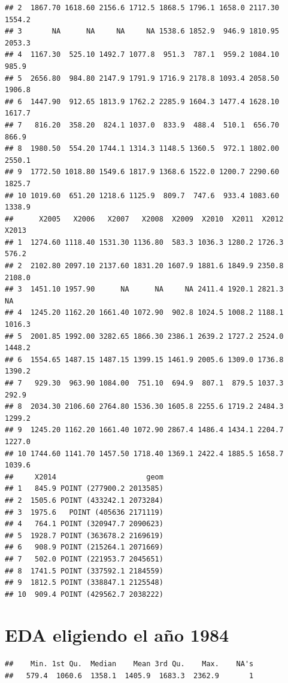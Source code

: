 \documentclass[11pt,]{article}
\newenvironment{Shaded}{\begin{snugshade}}{\end{snugshade}}
\newcommand{\KeywordTok}[1]{\textcolor[rgb]{0.13,0.29,0.53}{\textbf{#1}}}
\newcommand{\OperatorTok}[1]{\textcolor[rgb]{0.81,0.36,0.00}{\textbf{#1}}}
\newcommand{\NormalTok}[1]{#1}
\begin{document}
\begin{verbatim}
## 2  1867.70 1618.60 2156.6 1712.5 1868.5 1796.1 1658.0 2117.30 1554.2
## 3       NA      NA     NA     NA 1538.6 1852.9  946.9 1810.95 2053.3
## 4  1167.30  525.10 1492.7 1077.8  951.3  787.1  959.2 1084.10  985.9
## 5  2656.80  984.80 2147.9 1791.9 1716.9 2178.8 1093.4 2058.50 1906.8
## 6  1447.90  912.65 1813.9 1762.2 2285.9 1604.3 1477.4 1628.10 1617.7
## 7   816.20  358.20  824.1 1037.0  833.9  488.4  510.1  656.70  866.9
## 8  1980.50  554.20 1744.1 1314.3 1148.5 1360.5  972.1 1802.00 2550.1
## 9  1772.50 1018.80 1549.6 1817.9 1368.6 1522.0 1200.7 2290.60 1825.7
## 10 1019.60  651.20 1218.6 1125.9  809.7  747.6  933.4 1083.60 1338.9
##      X2005   X2006   X2007   X2008  X2009  X2010  X2011  X2012  X2013
## 1  1274.60 1118.40 1531.30 1136.80  583.3 1036.3 1280.2 1726.3  576.2
## 2  2102.80 2097.10 2137.60 1831.20 1607.9 1881.6 1849.9 2350.8 2108.0
## 3  1451.10 1957.90      NA      NA     NA 2411.4 1920.1 2821.3     NA
## 4  1245.20 1162.20 1661.40 1072.90  902.8 1024.5 1008.2 1188.1 1016.3
## 5  2001.85 1992.00 3282.65 1866.30 2386.1 2639.2 1727.2 2524.0 1448.2
## 6  1554.65 1487.15 1487.15 1399.15 1461.9 2005.6 1309.0 1736.8 1390.2
## 7   929.30  963.90 1084.00  751.10  694.9  807.1  879.5 1037.3  292.9
## 8  2034.30 2106.60 2764.80 1536.30 1605.8 2255.6 1719.2 2484.3 1299.2
## 9  1245.20 1162.20 1661.40 1072.90 2867.4 1486.4 1434.1 2204.7 1227.0
## 10 1744.60 1141.70 1457.50 1718.40 1369.1 2422.4 1885.5 1658.7 1039.6
##     X2014                     geom
## 1   845.9 POINT (277900.2 2013585)
## 2  1505.6 POINT (433242.1 2073284)
## 3  1975.6   POINT (405636 2171119)
## 4   764.1 POINT (320947.7 2090623)
## 5  1928.7 POINT (363678.2 2169619)
## 6   908.9 POINT (215264.1 2071669)
## 7   502.0 POINT (221953.7 2045651)
## 8  1741.5 POINT (337592.1 2184559)
## 9  1812.5 POINT (338847.1 2125548)
## 10  909.4 POINT (429562.7 2038222)
\end{verbatim}

\section{EDA eligiendo el año 1984}\label{eda-eligiendo-el-auxf1o-1984}

\begin{Shaded}
\end{Shaded}

\begin{verbatim}
##    Min. 1st Qu.  Median    Mean 3rd Qu.    Max.    NA's 
##   579.4  1060.6  1358.1  1405.9  1683.3  2362.9       1
\end{verbatim}
\end{document}
